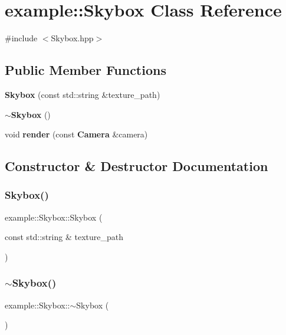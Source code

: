 \section{example\+::Skybox Class Reference}
\label{classexample_1_1_skybox}


{\ttfamily \#include $<$Skybox.\+hpp$>$}

\subsection*{Public Member Functions}
\begin{DoxyCompactItemize}
\item 
\textbf{ Skybox} (const std\+::string \&texture\+\_\+path)
\item 
\textbf{ $\sim$\+Skybox} ()
\item 
void \textbf{ render} (const \textbf{ Camera} \&camera)
\end{DoxyCompactItemize}


\subsection{Constructor \& Destructor Documentation}
\mbox{\label{classexample_1_1_skybox_ace3e8f934bac9a37fb6117bee9d002c0}} 
\subsubsection{Skybox()}
{\footnotesize\ttfamily example\+::\+Skybox\+::\+Skybox (\begin{DoxyParamCaption}\item[{const std\+::string \&}]{texture\+\_\+path }\end{DoxyParamCaption})}

\mbox{\label{classexample_1_1_skybox_abeed66eef405ebc5d29a4bdd949210d8}} 
\subsubsection{$\sim$Skybox()}
{\footnotesize\ttfamily example\+::\+Skybox\+::$\sim$\+Skybox (\begin{DoxyParamCaption}{ }\end{DoxyParamCaption})}



